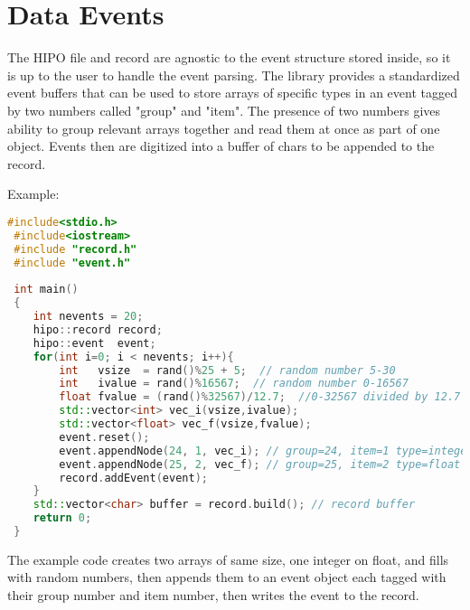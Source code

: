 \documentclass[12pt]{article}
\begin{document}
\section{Data Events}

The HIPO file and record are agnostic to the event structure stored inside, so it is up to the
user to handle the event parsing. The library provides a standardized event buffers that can be 
used to store arrays of specific types in an event tagged by two numbers called "group" and 
"item". The presence of two numbers gives ability to group relevant arrays together and
read them at once as part of one object. Events then are digitized into a buffer of chars 
to be appended to the record. 

Example:

\begin{lstlisting}[language=C++,directivestyle={\color{black}}
                   emph={int,char,double,float,unsigned},
                   emphstyle={\color{blue}}]
 #include<stdio.h> 
 #include<iostream>
 #include "record.h"
 #include "event.h"
 
 int main()
 {
    int nevents = 20;
    hipo::record record;
    hipo::event  event;
    for(int i=0; i < nevents; i++){ 
        int   vsize  = rand()%25 + 5;  // random number 5-30
        int   ivalue = rand()%16567;  // random number 0-16567
        float fvalue = (rand()%32567)/12.7;  //0-32567 divided by 12.7
        std::vector<int> vec_i(vsize,ivalue);
        std::vector<float> vec_f(vsize,fvalue);
        event.reset();
        event.appendNode(24, 1, vec_i); // group=24, item=1 type=integer
        event.appendNode(25, 2, vec_f); // group=25, item=2 type=float
        record.addEvent(event);
    }
    std::vector<char> buffer = record.build(); // record buffer
    return 0; 
 }
\end{lstlisting}

The example code creates two arrays of same size, one integer on float, and fills with
random numbers, then appends them to an event object each tagged with their group 
number and item number, then writes the event to the record. 
\end{document}
